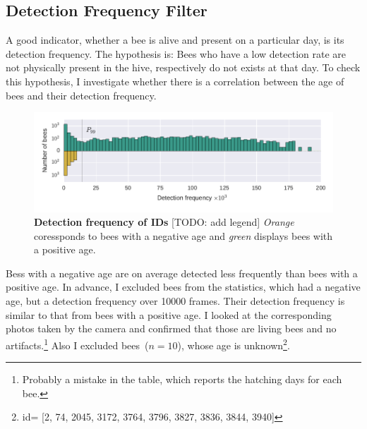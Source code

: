 

\subsection{Detection Frequency Filter}
A good indicator, whether a bee is alive and present on a particular day, is its detection frequency. The hypothesis is: Bees who have a low detection rate are not physically present in the hive, respectively do not exists at that day.
To check this hypothesis, I investigate whether there is a correlation between the age of bees and their detection frequency.

\begin{figure}[t]
	\centering
	\includegraphics[width=1.0\textwidth]{Figures/filter}
	\caption[Detection frequency of IDs]{\textbf{Detection frequency of IDs} [TODO: add legend] \emph{Orange} coressponds to bees with a negative age and \emph{green} displays bees with a positive age.\protect\footnotemark}
	\label{fig:filter}
\end{figure}


Bess with a negative age are on average detected less frequently than bees with a positive age.
In advance, I excluded bees from the statistics, which had a negative age, but a detection frequency over 10000 frames. Their detection frequency is similar to that from bees with a positive age. I looked at the corresponding photos taken by the camera and confirmed that those are living bees and no artifacts.\footnote{Probably a mistake in the table, which reports the hatching days for each bee.}
Also I excluded bees~($n=10$), whose age is unknown\footnote{id= [2,
    74,
    2045,
    3172,
    3764,
    3796,
    3827,
    3836,
    3844,
    3940]}.


